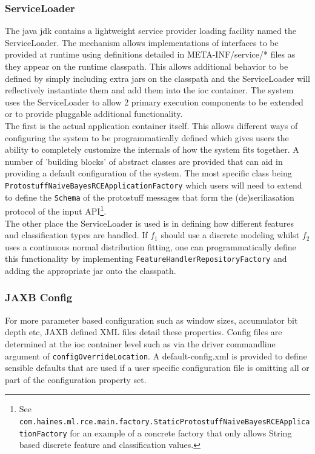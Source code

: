 \documentclass[a4paper,11pt]{scrreprt}
\begin{document}
\subsubsection{ServiceLoader}
The java \acrshort{jdk} contains a lightweight service provider loading facility named the ServiceLoader. The mechanism allows implementations of interfaces to be provided at runtime using definitions detailed in META-INF/service/* files as they appear on the runtime classpath. This allows additional behavior to be defined by simply including extra jars on the classpath and the ServiceLoader will reflectively instantiate them and add them into the \acrshort{ioc} container. The system uses the ServiceLoader to allow 2 primary execution components to be extended or to provide pluggable additional functionality.\\
The first is the actual application container itself. This allows different ways of configuring the system to be programmatically defined which gives users the ability to completely customize the internals of how the system fits together. A number of 'building blocks' of abstract classes are provided that can aid in providing a default configuration of the system. The most specific class being\\ \verb|ProtostuffNaiveBayesRCEApplicationFactory| which users will need to extend to define the \verb|Schema| of the protostuff messages that form the (de)seriliasation protocol of the input API\footnote{See \verb|com.haines.ml.rce.main.factory.StaticProtostuffNaiveBayesRCEApplicationFactory| for an example of a concrete factory that only allows String based discrete feature and classification values.}.\\

The other place the ServiceLoader is used is in defining how different features and classification types are handled. If \(f_1\) should use a discrete modeling whilst \(f_2\) uses a continuous normal distribution fitting, one can programmatically define this functionality by implementing \verb|FeatureHandlerRepositoryFactory| and adding the appropriate jar onto the classpath. 

\subsubsection{JAXB Config}
For more parameter based configuration such as window sizes, accumulator bit depth etc, JAXB defined XML files detail these properties. Config files are determined at the \acrshort{ioc} container level such as via the driver commandline argument of \verb|configOverrideLocation|. A default-config.xml is provided to define sensible defaults that are used if a user specific configuration file is omitting all or part of the configuration property set.
\end{document}
